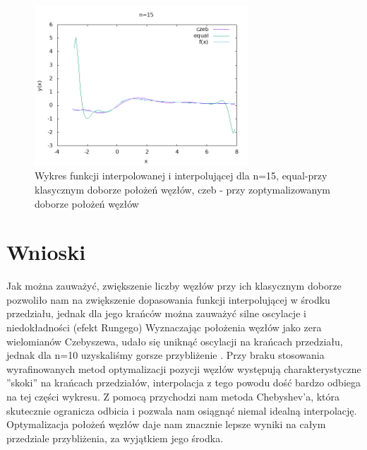 \documentclass{article}
\begin{document}
\begin{figure}[h!]
\centering
\includegraphics[width=8cm]{15.png}
\caption{Wykres funkcji interpolowanej i interpolującej dla n=15,  equal-przy klasycznym doborze położeń węzłów, czeb - przy zoptymalizowanym doborze położeń
węzłów}
\label{fig:obrazek 15}
\end{figure}

\newpage
\section{Wnioski}
\begin{flushleft}
Jak można zauważyć, zwiększenie liczby węzłów przy ich klasycznym doborze pozwoliło nam na zwiększenie dopasowania funkcji interpolującej w środku przedziału, jednak dla jego krańców można zauważyć silne oscylacje i niedokładności (efekt Rungego) Wyznaczając położenia węzłów jako zera wielomianów Czebyszewa, udało się uniknąć oscylacji na krańcach przedziału, jednak dla n=10 uzyskaliśmy gorsze przybliżenie . Przy braku stosowania wyrafinowanych metod optymalizacji pozycji węzłów występują charakterystyczne ”skoki” na krańcach przedziałów, interpolacja z tego powodu dość bardzo odbiega na tej części wykresu. Z pomocą przychodzi nam metoda Chebyshev’a, która skutecznie ogranicza odbicia i pozwala nam osiągnąć niemal idealną interpolację. Optymalizacja położeń węzłów daje nam znacznie lepsze wyniki na całym przedziale przybliżenia, za wyjątkiem jego środka.

\end{flushleft}
\end{document}
